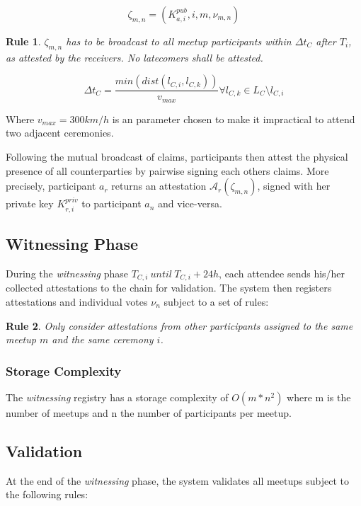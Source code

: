 \documentclass[conference]{IEEEtran}
\newtheorem{erule}{Rule}
\begin{document}
\begin{equation}
\zeta_{m,n} = \left(K_{a,i}^{pub}, i, m, \nu_{m,n} \right)
\end{equation}

\begin{erule}
	$\zeta_{m,n}$ has to be broadcast to all meetup participants within $\Delta t_C$ after $T_i$, as attested by the receivers. No latecomers shall be attested.
\end{erule}

\begin{equation}
\Delta t_C = \frac{min\left(dist\left(l_{C,i}, l_{C,k}\right)\right)}{v_{max}} \forall l_{C,k} \in L_C \setminus l_{C,i} 
\end{equation}

Where $v_{max} = 300km/h$ is an \encointer parameter chosen to make it impractical to attend two adjacent ceremonies.

Following the mutual broadcast of claims, participants then attest the physical presence of all counterparties by pairwise signing each others claims. More precisely, participant $a_r$ returns an attestation $\mathcal{A}_r\left(\zeta_{m,n}\right)$, signed with her private key $K^{priv}_{r,i}$ to participant $a_n$ and vice-versa.

\subsection{Witnessing Phase}
During the \emph{witnessing} phase $T_{C,i}\ until\ T_{C,i} + 24h$, each attendee sends his/her collected attestations to the \encointer chain for validation. The system then registers attestations and individual votes $\nu_n$ subject to a set of rules:

\begin{erule}
	Only consider attestations from \emph{other} participants \emph{assigned to the same meetup $m$} and the same ceremony $i$.
\end{erule}

\subsubsection{Storage Complexity}
The \emph{witnessing} registry has a storage complexity of $O(m*n^2)$ where m is the number of meetups and n the number of participants per meetup.

\subsection{Validation}
At the end of the \emph{witnessing} phase, the system validates all meetups subject to the following rules: 
\end{document}
